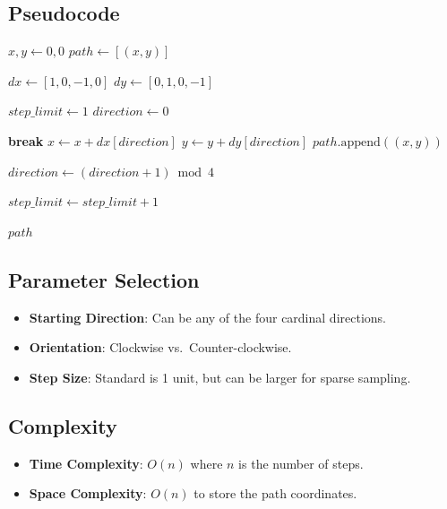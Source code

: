 \subsection{Pseudocode}
\begin{algorithm}
\caption{Square Spiral Walk}\label{alg:spiral_walk}
\begin{algorithmic}
    \State $x, y \gets 0, 0$
    \State $path \gets [(x, y)]$

    \State $dx \gets [1, 0, -1, 0]$
    \State $dy \gets [0, 1, 0, -1]$

    \State $step\_limit \gets 1$
    \State $direction \gets 0$

                    \State \textbf{break}
                \EndIf
                \State $x \gets x + dx[direction]$
                \State $y \gets y + dy[direction]$
                \State $path.\text{append}((x, y))$
            \EndFor

            \State $direction \gets (direction + 1) \bmod 4$
        \EndFor

        \State $step\_limit \gets step\_limit + 1$
    \EndWhile

    \Return $path$
\EndFunction
\end{algorithmic}
\end{algorithm}

\subsection{Parameter Selection}
\begin{itemize}
    \item \textbf{Starting Direction}: Can be any of the four cardinal directions.
    \item \textbf{Orientation}: Clockwise vs.\ Counter-clockwise.
    \item \textbf{Step Size}: Standard is 1 unit, but can be larger for sparse sampling.
\end{itemize}

\subsection{Complexity}
\begin{itemize}
    \item \textbf{Time Complexity}: $O(n)$ where $n$ is the number of steps.
    \item \textbf{Space Complexity}: $O(n)$ to store the path coordinates.
\end{itemize}

